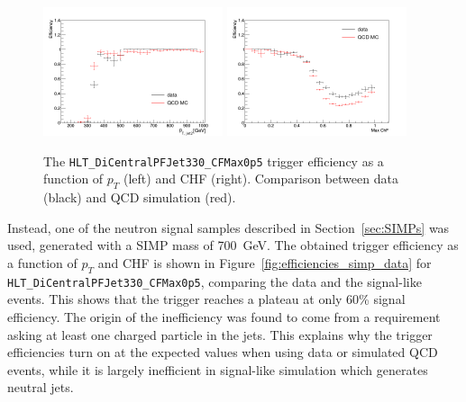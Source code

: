 \begin{figure}[ht]
  \centering
  \includegraphics[width=0.47\textwidth]{figures/trigger/pt_eff_05_DataMC.png}\hfill%
  \includegraphics[width=0.47\textwidth]{figures/trigger/chf_eff_05_DataMC.png}
  \caption{The \texttt{HLT\_DiCentralPFJet330\_CFMax0p5} trigger efficiency as a function of $p_{T}$ (left) and CHF (right). Comparison between data (black) and \acs{QCD} simulation (red). }
  \label{fig:efficiencies_qcd_data}
\end{figure}

Instead, one of the neutron signal samples described in Section~\ref{sec:SIMPs} was used, generated with a \ac{SIMP} mass of \SI{700}{GeV}. The obtained trigger efficiency as a function of $p_{T}$ and CHF is shown in Figure~\ref{fig:efficiencies_simp_data} for \texttt{HLT\_DiCentralPFJet330\_CFMax0p5}, comparing the data and the signal-like events. This shows that the trigger reaches a plateau at only 60\% signal efficiency. The origin of the inefficiency was found to come from a requirement asking at least one charged particle in the jets. This explains why the trigger efficiencies turn on at the expected values when using data or simulated \acs{QCD} events, while it is largely inefficient in signal-like simulation which generates neutral jets.

